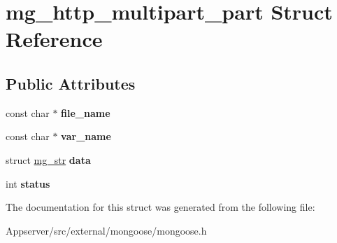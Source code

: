 \hypertarget{structmg__http__multipart__part}{}\section{mg\+\_\+http\+\_\+multipart\+\_\+part Struct Reference}
\label{structmg__http__multipart__part}
\subsection*{Public Attributes}
\begin{DoxyCompactItemize}
\item 
const char $\ast$ {\bfseries file\+\_\+name}\hypertarget{structmg__http__multipart__part_a838efa2eb99ad6cecd6ae714d4775091}{}\label{structmg__http__multipart__part_a838efa2eb99ad6cecd6ae714d4775091}

\item 
const char $\ast$ {\bfseries var\+\_\+name}\hypertarget{structmg__http__multipart__part_af3c6e9825e31f000ec9e26c016eaa707}{}\label{structmg__http__multipart__part_af3c6e9825e31f000ec9e26c016eaa707}

\item 
struct \hyperlink{structmg__str}{mg\+\_\+str} {\bfseries data}\hypertarget{structmg__http__multipart__part_a803db4feee24a462665d487acbeb1953}{}\label{structmg__http__multipart__part_a803db4feee24a462665d487acbeb1953}

\item 
int {\bfseries status}\hypertarget{structmg__http__multipart__part_a728d1246c153ef43fb1f821bee61925a}{}\label{structmg__http__multipart__part_a728d1246c153ef43fb1f821bee61925a}

\end{DoxyCompactItemize}


The documentation for this struct was generated from the following file\+:\begin{DoxyCompactItemize}
\item 
Appserver/src/external/mongoose/mongoose.\+h\end{DoxyCompactItemize}
